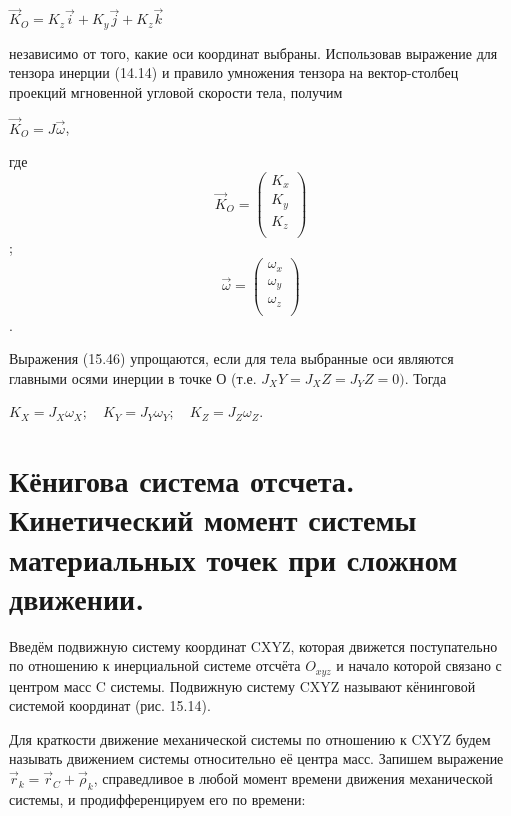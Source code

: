 {\begin{center}
	  \par $\vec K_O = K_z \vec i + K_y \vec j + K_z \vec k$

	  \par независимо от того, какие оси координат выбраны. Использовав выражение для тензора инерции (14.14) и правило умножения тензора на вектор-столбец проекций мгновенной угловой скорости тела, получим

	  \par $\vec K_O = J \vec\omega$,

	  \par где  \begin{equation*}
						\vec K_O = \left(
						\begin{array}{c}
							K_x\\
							K_y\\ 
							K_z\\  
						\end{array}
						\right)
					\end{equation*};
					      \begin{equation*}
							   \vec\omega = \left(
								\begin{array}{c}
									\omega_x\\
									\omega_y\\ 
									\omega_z\\  
								\end{array}
								\right)
							\end{equation*}.
       \par Выражения (15.46) упрощаются, если для тела выбранные оси являются главными осями инерции в точке О (т.е. $J_XY = J_XZ = J_YZ = 0)$. Тогда

	  \par $K_X = J_X \omega_X; \quad K_Y = J_Y \omega_Y; \quad K_Z = J_Z \omega_Z$.
    
\end{center}
\section{Кёнигова система отсчета. Кинетический момент системы материальных точек при сложном движении.}
\begin{center}
  \par Введём подвижную систему координат CXYZ, которая движется поступательно по отношению к инерциальной системе отсчёта $O_{xyz}$ и начало которой связано с центром масс C системы. Подвижную систему CXYZ называют кёнинговой системой координат (рис. 15.14).
	  \par Для краткости движение механической системы по отношению к CXYZ будем называть  движением системы относительно её центра масс. Запишем выражение $\vec r_k = \vec r_C + \vec\rho_k$, справедливое в любой момент времени движения механической системы, и продифференцируем его по времени:


\end{center}}
